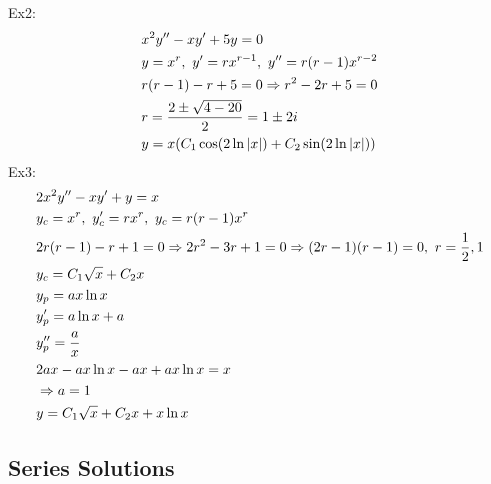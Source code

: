 \documentclass[11pt, fleqn]{article}
\begin{document}
Ex2:
\begin{align*}
    &x^2y''-xy'+5y=0\\
    &y=x^r,\ y'=rx^{r-1},\ y''=r(r-1)x^{r-2}\\
    &r(r-1)-r+5=0\Rightarrow r^2-2r+5=0\\
    &r=\frac{2\pm\sqrt{4-20}}{2}=1\pm2i\\
    &y=x(C_1\cos(2\ln|x|)+C_2\sin(2\ln|x|))
\end{align*}
Ex3:
\begin{align*}
    &2x^2y''-xy'+y=x\\
    &y_c=x^r,\ y_c'=rx^r,\ y_c=r(r-1)x^r\\
    &2r(r-1)-r+1=0\Ra 2r^2-3r+1=0\Ra (2r-1)(r-1)=0,\ r=\frac{1}{2},1\\
    &y_c=C_1\sqrt{x}+C_2x\\
    &y_p=ax\ln x\\
    &y_p'=a\ln x+a\\
    &y_p''=\frac{a}{x}\\
    &2ax-ax\ln x-ax+ax\ln x=x\\
    &\Ra a=1\\
    &y=C_1\sqrt{x}+C_2x+x\ln x
\end{align*}












\subsection{Series Solutions}
\end{document}
